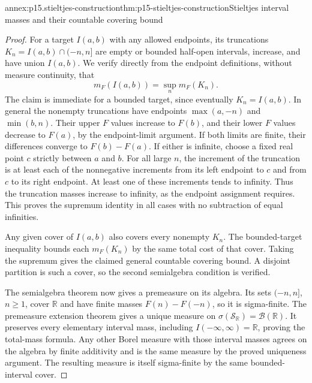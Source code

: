 \begin{annexitem}{annex:p15.stieltjes-construction}{thm:p15-stieltjes-construction}{Stieltjes interval masses and their countable covering bound}
\begin{proof}
For a target \(I(a,b)\) with any allowed endpoints, its truncations
\(K_n=I(a,b)\cap(-n,n]\) are empty or bounded half-open intervals,
increase, and have union \(I(a,b)\). We verify directly from the
endpoint definitions, without measure continuity, that
\[
 m_F(I(a,b))=\sup_n m_F(K_n).
\]
The claim is immediate for a bounded target, since eventually
\(K_n=I(a,b)\). In general the nonempty truncations have endpoints
\(\max(a,-n)\) and \(\min(b,n)\). Their upper \(F\) values
increase to \(F(b)\), and their lower \(F\) values decrease to
\(F(a)\), by the endpoint-limit argument. If both limits are finite,
their differences converge to \(F(b)-F(a)\). If either is infinite,
choose a fixed real point \(c\) strictly between \(a\) and \(b\).
For all large \(n\), the increment of the truncation is at least each
of the nonnegative increments from its left endpoint to \(c\) and
from \(c\) to its right endpoint. At least one of these increments
tends to infinity. Thus the truncation masses increase to infinity,
as the endpoint assignment requires. This proves the supremum identity
in all cases with no subtraction of equal infinities.

Any given cover of \(I(a,b)\) also covers every nonempty \(K_n\).
The bounded-target inequality bounds each \(m_F(K_n)\) by the same
total cost of that cover. Taking the supremum gives the claimed general
countable covering bound. A disjoint partition is such a cover, so the
second semialgebra condition is verified.

The semialgebra theorem now gives a premeasure on its algebra. Its
sets \((-n,n]\), \(n\geq1\), cover \(\mathbb R\) and have
finite masses \(F(n)-F(-n)\), so it is sigma-finite. The premeasure
extension theorem gives a unique measure on
\(\sigma(\mathcal S_{\mathbb R})=\mathcal B(\mathbb R)\).
It preserves every elementary interval mass, including
\(I(-\infty,\infty)=\mathbb R\), proving the total-mass formula.
Any other Borel measure with those interval masses agrees on the algebra
by finite additivity and is the same measure by the proved uniqueness
argument. The resulting measure is itself sigma-finite by the same
bounded-interval cover.
\end{proof}
\end{annexitem}

